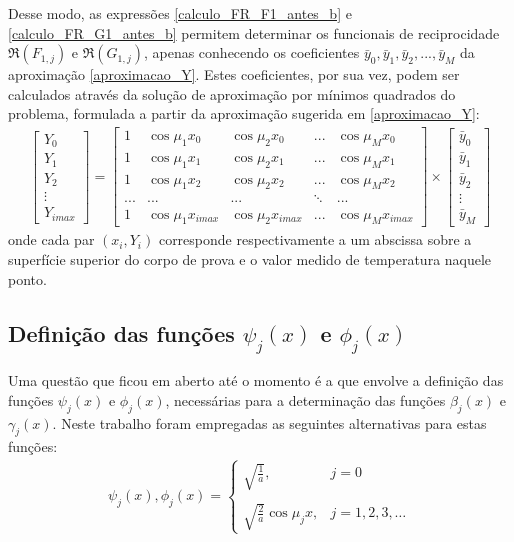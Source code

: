 Desse modo, as expressões \eqref{calculo_FR_F1_antes_b} e \eqref{calculo_FR_G1_antes_b} permitem determinar os funcionais de reciprocidade $\Re(F_{1,j})$ e $\Re(G_{1,j})$, apenas conhecendo os coeficientes $\bar{y}_0, \bar{y}_1, \bar{y}_2, ..., \bar{y}_M$ da aproximação \eqref{aproximacao_Y}. Estes coeficientes, por sua vez, podem ser calculados através da solução de aproximação por mínimos quadrados do problema, formulada a partir da aproximação sugerida em \eqref{aproximacao_Y}:
\begin{align}
\begin{bmatrix}
Y_0 \\ Y_1 \\ Y_2 \\ \vdots \\ Y_{imax}
\end{bmatrix}
=
\begin{bmatrix}
1 & \cos\mu_1 x_0 & \cos \mu_2 x_0 & ... & \cos\mu_M x_0 \\
1 & \cos\mu_1 x_1 & \cos \mu_2 x_1 & ... & \cos\mu_M x_1 \\
1 & \cos\mu_1 x_2 & \cos \mu_2 x_2 & ... & \cos\mu_M x_2 \\
... & ... & ... & \ddots & ... \\
1 & \cos\mu_1 x_{imax} & \cos \mu_2 x_{imax} & ... & \cos\mu_M x_{imax}
\end{bmatrix}
\times
\begin{bmatrix}
\bar{y}_0 \\ \bar{y}_1 \\ \bar{y}_2 \\ \vdots \\ \bar{y}_M
\end{bmatrix}
\label{sistema_aproximacao_Y}
\end{align}
onde cada par $(x_i, Y_i)$ corresponde respectivamente a um abscissa sobre a superfície superior do corpo de prova e o valor medido de temperatura naquele ponto.


\subsection{Definição das funções $\psi_j(x)$ e $\phi_j(x)$}
Uma questão que ficou em aberto até o momento é a que envolve a definição das funções $\psi_j(x)$ e $\phi_j(x)$, necessárias para a determinação das funções $\beta_j(x)$ e $\gamma_j(x)$. Neste trabalho foram empregadas as seguintes alternativas para estas funções:
\begin{align}
\psi_j(x), \phi_j(x) = \left\lbrace
\begin{array}{ll}
\displaystyle\sqrt{\frac{1}{a}}, & j = 0 \\ \nonumber \\
\displaystyle\sqrt{\frac{2}{a}}\cos \mu_j x, & j = 1,2,3,\ldots
\end{array}
\right.
\end{align} 

